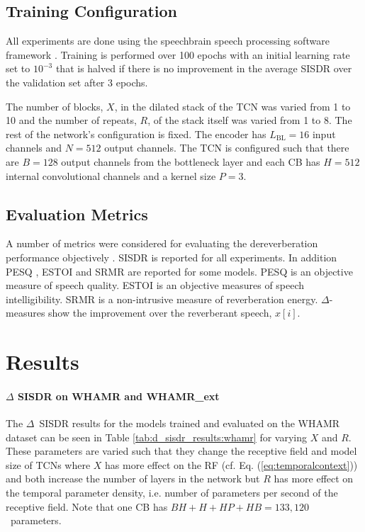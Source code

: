 \documentclass[conference,a4paper]{IEEEtran}
\begin{document}
\subsection{Training Configuration}
All experiments are done using the speechbrain speech processing software framework \cite{speechbrain}. Training is performed over 100 epochs with an initial learning rate set to $10^{-3}$ that is halved if there is no improvement in the average \ac{SISDR} over the validation set after 3 epochs.

The number of blocks, $X$, in the dilated stack of the \ac{TCN} was varied from 1 to 10 and the number of repeats, $R$, of the stack itself was varied from 1 to 8. The  rest of the network's configuration is fixed. The encoder has $L_{\mathrm{BL}}=16$ input channels and $N=512$ output channels. The \ac{TCN} is configured such that there are $B=128$ output channels from the bottleneck layer and each \ac{CB} has $H=512$ internal convolutional channels and a kernel size $P=3$.

\subsection{Evaluation Metrics}
A number of metrics were considered for evaluating the dereverberation performance objectively {\cite{Goetze2}}. \ac{SISDR} is reported for all experiments. In addition \ac{PESQ} \cite{PESQ},
\ac{ESTOI} \cite{estoi} and \ac{SRMR} \cite{srmr} are reported for some models. \ac{PESQ} is an objective measure of speech quality. \ac{ESTOI} is an objective measures of speech intelligibility. \ac{SRMR} is a non-intrusive measure of reverberation energy. $\Delta$-measures show the improvement over the reverberant speech, $x[i]$.
\section{Results}\label{sec:5}

\paragraph{ $\Delta$ \ac{SISDR} on WHAMR and WHAMR\_ext}
The $\Delta$~SISDR results for the models trained and evaluated on the WHAMR dataset can be seen in Table \ref{tab:d_sisdr_results:whamr} {for varying $X$ and $R$}. These parameters are varied such that they change the receptive field and model size of \acp{TCN} where $X$ has more effect on the \ac{RF} (cf. Eq. (\ref{eq:temporalcontext})) and both increase the number of layers in the network but $R$ has more effect on the temporal parameter density, i.e. number of parameters per second of the receptive field. Note that one \ac{CB} has ${B H+H+H P+H B=133,120}$~parameters. 
\end{document}

